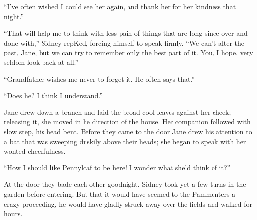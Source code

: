 ``I've often wished I could see her again, and thank her for her
kindness that night.''

``That will help me to think with less
{\protect\hypertarget{120}{}{}}pain of things that are long since over
and done with,'' Sidney repKed, forcing himself to speak firmly. ``We
can't alter the past, Jane, but we can try to remember only the best
part of it. You, I hope, very seldom look back at all.''

``Grandfather wishes me never to forget it. He often says that.''

``Does he? I think I understand.''

Jane drew down a branch and laid the broad cool leaves against her
cheek; releasing it, she moved in he direction of the house. Her
companion followed with slow step, his head bent. Before they came to
the door Jane drew his attention to a bat that was sweeping duskily
above their heads; she began to speak with her wonted cheerfulness.

``How I should like Pennyloaf to be here! I wonder what she'd think of
it?''

At the door they bade each other goodnight. Sidney took yet a few turns
in the garden before entering. But that it would have seemed to the
Pammenters a crazy proceeding, he would have gladly struck away over the
fields and walked for hours.
